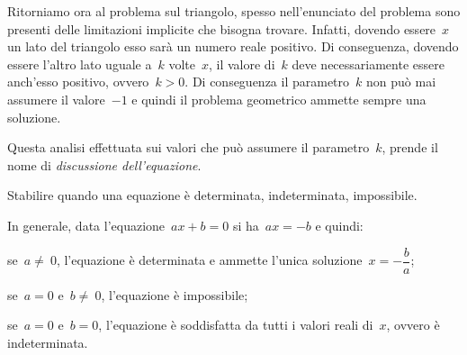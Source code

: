 Ritorniamo ora al problema sul triangolo, spesso nell’enunciato del problema sono presenti delle limitazioni implicite
che bisogna trovare. Infatti, dovendo essere~$x$ un lato del triangolo esso sarà un numero reale positivo.
Di conseguenza, dovendo essere l’altro lato uguale a~$k$ volte~$x$, il valore di~$k$ deve necessariamente essere anch'esso positivo, ovvero~$k>0$.
Di conseguenza il parametro~$k$ non può mai assumere il valore~$-1$ e quindi il problema geometrico ammette sempre una soluzione.

Questa analisi effettuata sui valori che può assumere il parametro~$k$, prende il nome di \emph{discussione dell’equazione}.
\begin{procedura}
Stabilire quando una equazione è determinata, indeterminata, impossibile.

In generale, data l'equazione~$ax+b=0$ si ha~$ax=-b$ e quindi:
\begin{enumeratea}
\item se~$a\neq~0$, l’equazione è determinata e ammette l’unica soluzione~$x=-\dfrac{b}{a}$;
\item se~$a=0$ e~$b\neq~0$, l’equazione è impossibile;
\item se~$a=0$ e~$b=0$, l’equazione è soddisfatta da tutti i valori reali di~$x$, ovvero è indeterminata.
\end{enumeratea}
\end{procedura}

